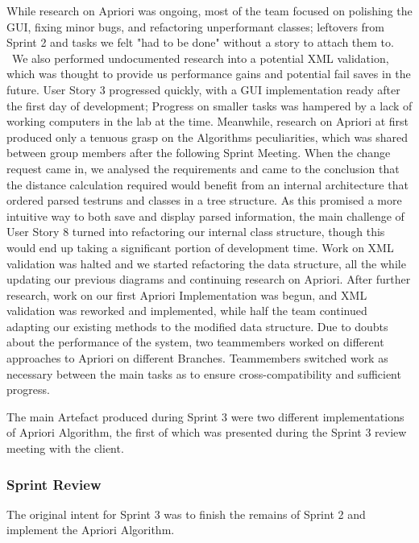 While research on Apriori was ongoing, most of the team focused on polishing the GUI, fixing minor bugs, and refactoring unperformant classes; leftovers from Sprint 2 and tasks we felt "had to be done" without a story to attach them to. \ 
We also performed undocumented research into a potential XML validation, which was thought to provide us performance gains and potential fail saves in the future.
User Story 3 progressed quickly, with a GUI implementation ready after the first day of development; Progress on smaller tasks was hampered by a lack of working computers in the lab at the time.
Meanwhile, research on Apriori at first produced only a tenuous grasp on the Algorithms peculiarities, which was shared between group members after the following Sprint Meeting. 
When the change request came in, we analysed the requirements and came to the conclusion that the distance calculation required would benefit from an internal architecture that ordered parsed testruns and classes in a tree structure. 
As this promised a more intuitive way to both save and display parsed information, the main challenge of User Story 8 turned into refactoring our internal class structure, though this would end up taking a significant portion of development time. 
Work on XML validation was halted and we started refactoring the data structure, all the while updating our previous diagrams and continuing research on Apriori.
After further research, work on our first Apriori Implementation was begun, and XML validation was reworked and implemented, while half the team continued adapting our existing methods to the modified data structure. Due to doubts about the performance of the system, two teammembers worked on different approaches to Apriori on different Branches. Teammembers switched work as necessary between the main tasks as to ensure cross-compatibility and sufficient progress. 

The main Artefact produced during Sprint 3 were two different implementations of Apriori Algorithm, the first of which was presented during the Sprint 3 review meeting with the client. 


\subsubsection*{Sprint Review}

The original intent for Sprint 3 was to finish the remains of Sprint 2 and implement the Apriori Algorithm. 

